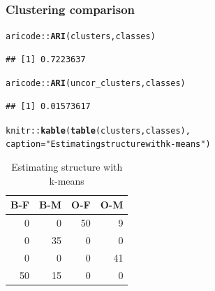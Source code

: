 \documentclass{beamer}\usepackage[]{graphicx}\usepackage[]{color}
\makeatletter
\newcommand{\hlstr}[1]{\textcolor[rgb]{0.192,0.494,0.8}{#1}}%
\newcommand{\hlopt}[1]{\textcolor[rgb]{0,0,0}{#1}}%
\newcommand{\hlstd}[1]{\textcolor[rgb]{0.345,0.345,0.345}{#1}}%
\newcommand{\hlkwc}[1]{\textcolor[rgb]{0.333,0.667,0.333}{#1}}%
\newcommand{\hlkwd}[1]{\textcolor[rgb]{0.737,0.353,0.396}{\textbf{#1}}}%
\newenvironment{kframe}{%
 \def\at@end@of@kframe{}%
 \ifinner\ifhmode%
  \def\at@end@of@kframe{\end{minipage}}%
  \begin{minipage}{\columnwidth}%
 \fi\fi%
 \def\FrameCommand##1{\hskip\@totalleftmargin \hskip-\fboxsep
 \colorbox{shadecolor}{##1}\hskip-\fboxsep
     \hskip-\linewidth \hskip-\@totalleftmargin \hskip\columnwidth}%
 \MakeFramed {\advance\hsize-\width
   \@totalleftmargin\z@ \linewidth\hsize
   \@setminipage}}%
 {\par\unskip\endMakeFramed%
 \at@end@of@kframe}
\newenvironment{knitrout}{}{} %
\makeatother
\begin{document}
% 

\begin{frame}[fragile]
  \frametitle{Clustering comparison}

\begin{knitrout}\scriptsize
{}\color{fgcolor}\begin{kframe}
\begin{alltt}
\hlstd{aricode}\hlopt{::}\hlkwd{ARI}\hlstd{(clusters, classes)}
\end{alltt}
\begin{verbatim}
## [1] 0.7223637
\end{verbatim}
\begin{alltt}
\hlstd{aricode}\hlopt{::}\hlkwd{ARI}\hlstd{(uncor_clusters, classes)}
\end{alltt}
\begin{verbatim}
## [1] 0.01573617
\end{verbatim}
\end{kframe}
\end{knitrout}

\begin{knitrout}\scriptsize
{}\color{fgcolor}\begin{kframe}
\begin{alltt}
\hlstd{knitr}\hlopt{::}\hlkwd{kable}\hlstd{(}\hlkwd{table}\hlstd{(clusters, classes),}
\hlkwc{caption} \hlstd{=} \hlstr{"Estimating structure with k-means"}\hlstd{)}
\end{alltt}
\end{kframe}\begin{table}

\caption{\label{tab:contingency_table_kmeans}Estimating structure with k-means}
\centering
\begin{tabular}[t]{r|r|r|r}
\hline
B-F & B-M & O-F & O-M\\
\hline
0 & 0 & 50 & 9\\
\hline
0 & 35 & 0 & 0\\
\hline
0 & 0 & 0 & 41\\
\hline
50 & 15 & 0 & 0\\
\hline
\end{tabular}
\end{table}


\end{knitrout}

\end{frame}
\end{document}
